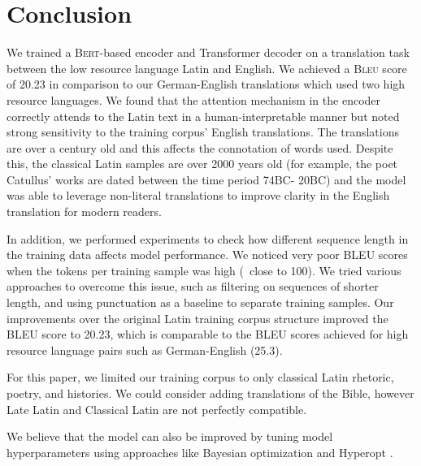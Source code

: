 \documentclass[11pt,a4paper]{article}
\begin{document}
\section{Conclusion}

We trained a \textsc{Bert}-based encoder and Transformer decoder on
a translation task between the low resource language Latin
and English.
We achieved a \textsc{Bleu} score of 20.23 in comparison to
our German-English translations which used two high resource languages.
We found that the attention mechanism in the encoder correctly attends to the Latin text in a human-interpretable manner
but noted strong sensitivity to the training corpus' English translations.
The translations are over a century old
and this affects the connotation of words used.
Despite this, the classical Latin samples are over 2000 years old (for example, the poet Catullus' works are dated between the time period 74BC- 20BC)
and the model was able to leverage non-literal translations to improve clarity in the English translation for modern readers.

In addition, we performed experiments to check how different sequence length in the training data affects model performance. We noticed very poor BLEU scores when the tokens per training sample was high (~close to 100). We tried various approaches to overcome this issue, such as filtering on sequences of shorter length, and using punctuation as a baseline to separate training samples. Our improvements over the original Latin training corpus structure improved the BLEU score to 20.23, which is comparable to the BLEU scores achieved for high resource language pairs such as German-English (25.3).

For this paper, we limited our training corpus to only classical Latin rhetoric, poetry, and histories.
We could consider adding translations of the Bible,
however Late Latin and Classical Latin are not perfectly compatible.


We believe that the model can also be improved by tuning model hyperparameters using approaches like Bayesian optimization \cite{snoek2015scalable} and Hyperopt \cite{bergstra2015hyperopt}.


\end{document}
